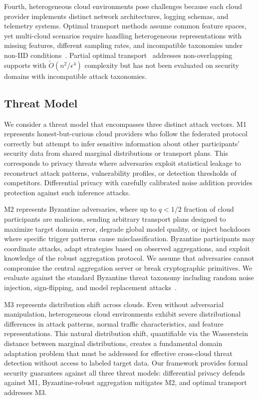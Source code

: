 \documentclass{ieeeaccess}
\theoremstyle{plain}
\theoremstyle{definition}
\theoremstyle{remark}
\begin{document}
Fourth, heterogeneous cloud environments pose challenges because each cloud provider implements distinct network architectures, logging schemas, and telemetry systems. Optimal transport methods assume common feature spaces, yet multi-cloud scenarios require handling heterogeneous representations with missing features, different sampling rates, and incompatible taxonomies under non-IID conditions~\cite{li2020noniid}. Partial optimal transport~\cite{nguyen2024} addresses non-overlapping supports with $\tilde{O}(n^2/\epsilon^4)$ complexity but has not been evaluated on security domains with incompatible attack taxonomies.

\subsection{Threat Model}

We consider a threat model that encompasses three distinct attack vectors. M1 represents honest-but-curious cloud providers who follow the federated protocol correctly but attempt to infer sensitive information about other participants' security data from shared marginal distributions or transport plans. This corresponds to privacy threats where adversaries exploit statistical leakage to reconstruct attack patterns, vulnerability profiles, or detection thresholds of competitors. Differential privacy with carefully calibrated noise addition provides protection against such inference attacks.

M2 represents Byzantine adversaries, where up to $q < 1/2$ fraction of cloud participants are malicious, sending arbitrary transport plans designed to maximize target domain error, degrade global model quality, or inject backdoors where specific trigger patterns cause misclassification. Byzantine participants may coordinate attacks, adapt strategies based on observed aggregations, and exploit knowledge of the robust aggregation protocol. We assume that adversaries cannot compromise the central aggregation server or break cryptographic primitives. We evaluate against the standard Byzantine threat taxonomy including random noise injection, sign-flipping, and model replacement attacks~\cite{fang2020local}.

M3 represents distribution shift across clouds. Even without adversarial manipulation, heterogeneous cloud environments exhibit severe distributional differences in attack patterns, normal traffic characteristics, and feature representations. This natural distribution shift, quantifiable via the Wasserstein distance between marginal distributions, creates a fundamental domain adaptation problem that must be addressed for effective cross-cloud threat detection without access to labeled target data. Our framework provides formal security guarantees against all three threat models: differential privacy defends against M1, Byzantine-robust aggregation mitigates M2, and optimal transport addresses M3.
\end{document}
